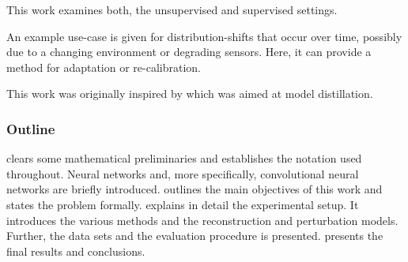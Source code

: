 This work examines both, the unsupervised and supervised settings.


An example use-case is given for distribution-shifts that occur over time,
possibly due to a changing environment or degrading sensors.
Here, it can provide a method for adaptation or re-calibration.

This work was originally inspired by \cite{DeepInversion} 
which was aimed
at model distillation.


\subsubsection{Outline}

 clears some mathematical preliminaries and establishes the notation 
used throughout. Neural networks and, 
more specifically, convolutional neural networks are briefly introduced.
 outlines the main objectives of this work and 
states the problem formally.
 explains in detail the experimental setup.
It introduces the various methods and the reconstruction and perturbation models.
Further, the data sets and the evaluation procedure is presented.
 presents the final results and conclusions.
